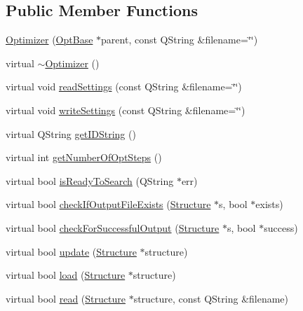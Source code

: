 \subsection*{Public Member Functions}
\begin{DoxyCompactItemize}
\item 
\hyperlink{classGlobalSearch_1_1Optimizer_a8c5a3335ff76f8a6a21a160d0139d842}{Optimizer} (\hyperlink{classGlobalSearch_1_1OptBase}{Opt\+Base} $\ast$parent, const Q\+String \&filename=\char`\"{}\char`\"{})
\item 
virtual \hyperlink{classGlobalSearch_1_1Optimizer_ace719aed9bbba0b3a568513ff68f8067}{$\sim$\+Optimizer} ()
\item 
virtual void \hyperlink{classGlobalSearch_1_1Optimizer_afef2dc22aa09df5e50e2f7b4f492091a}{read\+Settings} (const Q\+String \&filename=\char`\"{}\char`\"{})
\item 
virtual void \hyperlink{classGlobalSearch_1_1Optimizer_af67c36d87d7b41b1e91773b519d77829}{write\+Settings} (const Q\+String \&filename=\char`\"{}\char`\"{})
\item 
virtual Q\+String \hyperlink{classGlobalSearch_1_1Optimizer_aa81df016b0c8f3055a5e9e917eaefc75}{get\+I\+D\+String} ()
\item 
virtual int \hyperlink{classGlobalSearch_1_1Optimizer_aeeb18e38fa60535f74b577591400dd60}{get\+Number\+Of\+Opt\+Steps} ()
\item 
virtual bool \hyperlink{classGlobalSearch_1_1Optimizer_a10d37164307814e91c55bf846a59a80b}{is\+Ready\+To\+Search} (Q\+String $\ast$err)
\item 
virtual bool \hyperlink{classGlobalSearch_1_1Optimizer_afb5058a5e6a94e49c249284401680d5f}{check\+If\+Output\+File\+Exists} (\hyperlink{classGlobalSearch_1_1Structure}{Structure} $\ast$s, bool $\ast$exists)
\item 
virtual bool \hyperlink{classGlobalSearch_1_1Optimizer_a8d9373ded1b851ae6fdcbff41ed911cf}{check\+For\+Successful\+Output} (\hyperlink{classGlobalSearch_1_1Structure}{Structure} $\ast$s, bool $\ast$success)
\item 
virtual bool \hyperlink{classGlobalSearch_1_1Optimizer_a7e57844e4e6d713c87e6cf29ea03c5e2}{update} (\hyperlink{classGlobalSearch_1_1Structure}{Structure} $\ast$structure)
\item 
virtual bool \hyperlink{classGlobalSearch_1_1Optimizer_a5a2c5bc75be24ee41c27c1a2fe0e446a}{load} (\hyperlink{classGlobalSearch_1_1Structure}{Structure} $\ast$structure)
\item 
virtual bool \hyperlink{classGlobalSearch_1_1Optimizer_a671035cb8c0afbb4a1755b395bd063bd}{read} (\hyperlink{classGlobalSearch_1_1Structure}{Structure} $\ast$structure, const Q\+String \&filename)

\end{DoxyCompactItemize}
